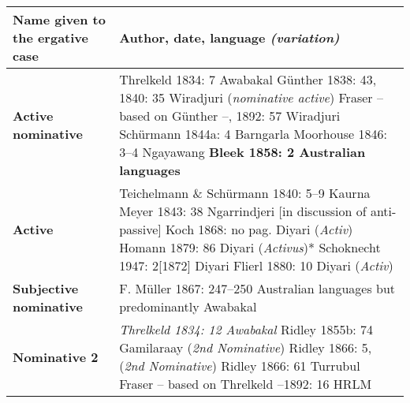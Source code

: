 \begin{table}
	\small
    \begin{tabularx}{\textwidth}{Qp{9cm}}
        \lsptoprule
        Name given to the ergative case & Author, date, language \textit{(variation)}  \\
        \midrule
        \textbf{Active \newline nominative} &	Threlkeld 1834: 7 Awabakal 
                            \newline Günther 1838: 43, 1840: 35 Wiradjuri (\textit{nominative active})
                            \newline Fraser – based on Günther –, 1892: 57 Wiradjuri
                            \newline Schürmann 1844a: 4 Barngarla
                            \newline Moorhouse 1846: 3--4 Ngayawang
                            \newline \textbf{Bleek 1858: 2 Australian languages} \\
\tablevspace
        \textbf{Active} &	Teichelmann \& Schürmann 1840: 5--9 Kaurna
                            \newline Meyer 1843: 38 Ngarrindjeri [in discussion of anti-passive]
                            \newline Koch 1868: no pag. Diyari (\textit{Activ})
                            \newline Homann 1879: 86 Diyari (\textit{Activus})*
                            \newline Schoknecht 1947: 2[1872] Diyari
                            \newline Flierl 1880: 10 Diyari (\textit{Activ}) \\
\tablevspace
        \textbf{Subjective nominative} &	F. Müller 1867: 247--250 Australian languages but predominantly Awabakal \\
\tablevspace
        \textbf{Nominative 2} &	\textit{Threlkeld 1834: 12 Awabakal}
                                \newline Ridley 1855b: 74 Gamilaraay (\textit{2nd Nominative})
                                \newline Ridley 1866: 5, (\textit{2nd Nominative})
                                \newline Ridley 1866: 61 Turrubul
                                \newline Fraser – based on Threlkeld –1892: 16 HRLM

\end{tabularx}
\end{table}
